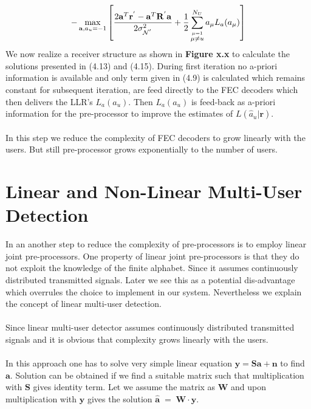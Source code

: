 \begin{equation}
-\max_{\mathrm{\mathbf{a}},a_u=-1}\left[ \frac{\hbox{$2\mathrm{\mathbf{a}}^T\mathrm{\mathbf{r}}^{'}-\mathrm{\mathbf{a}}^T\mathrm{\mathbf{R}}^{'}\mathrm{\mathbf{a}}$}}{\hbox{$2\sigma^2_{\mathcal{N}^{'}}$}}+\frac{\hbox{$1$}}{\hbox{$2$}} \sum\limits_{\stackrel{\mu=1}{\mu \ne u}}^{N_U}a_{\mu}L_a(a_\mu) \right]
\end{equation}
We now realize a receiver structure as shown in \textbf{Figure x.x} to calculate the solutions presented in (4.13) and (4.15). During first iteration no a-priori information is available and only term given in (4.9) is calculated which remains constant for subsequent iteration, are feed directly to the FEC decoders which then delivers the LLR's $L_a(a_u)$. Then $L_a(a_u)$ is feed-back as a-priori information for the pre-processor to improve the estimates of $L(\hat{a}_u\vert \mathrm{\mathbf{r}})$. \\ \\
In this step we reduce the complexity of FEC decoders to grow linearly with the users. But still pre-processor grows exponentially to the number of users.
\section{Linear and Non-Linear Multi-User Detection}
In an another step to reduce the complexity of pre-processors is to employ linear joint pre-processors. One property of linear joint pre-processors is that they do not exploit the knowledge of the finite alphabet. Since it assumes continuously distributed transmitted signals. Later we see this as a potential dis-advantage which overrules the choice to implement in our system. Nevertheless we explain the concept of linear multi-user detection. \\ \\
Since linear multi-user detector assumes continuously distributed transmitted signals and it is obvious that complexity grows linearly with the users. \\ \\
In this approach one has to solve very simple linear equation $\mathrm{\mathbf{y}}=\mathrm{\mathbf{S}}\mathrm{\mathbf{a}}+\mathrm{\mathbf{n}}$ to find $\mathrm{\mathbf{a}}$. Solution can be obtained if we find a suitable matrix such that multiplication with $\mathrm{\mathbf{S}}$ gives identity term. Let we assume the matrix as $\mathrm{\mathbf{W}}$ and upon multiplication with $\mathrm{\mathbf{y}}$ gives the solution $\mathrm{\mathbf{\hat{a}}}\;=\;\mathrm{\mathbf{W}}\cdot\mathrm{\mathbf{y}}$.
